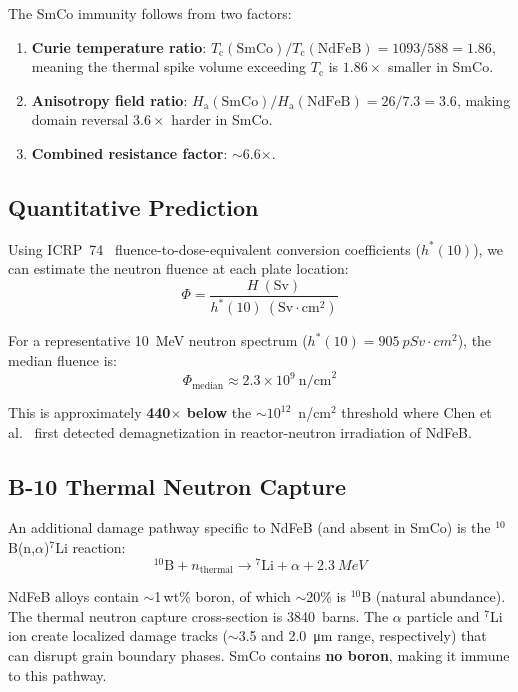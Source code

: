\documentclass[11pt,letterpaper]{article}
\newcommand{\ndfeb}{NdFeB}
\newcommand{\smco}{SmCo}
\newcommand{\Tc}{T_\mathrm{c}}
\newcommand{\Ha}{H_\mathrm{a}}
\begin{document}
The \smco{} immunity follows from two factors:
\begin{enumerate}
    \item \textbf{Curie temperature ratio}: $\Tc(\mathrm{SmCo})/\Tc(\mathrm{NdFeB}) =
    1093/588 = 1.86$, meaning the thermal spike volume exceeding $\Tc$ is
    $1.86\times$ smaller in \smco{}.
    \item \textbf{Anisotropy field ratio}: $\Ha(\mathrm{SmCo})/\Ha(\mathrm{NdFeB}) =
    26/7.3 = 3.6$, making domain reversal $3.6\times$ harder in \smco{}.
    \item \textbf{Combined resistance factor}: $\sim$6.6$\times$.
\end{enumerate}

\subsection{Quantitative Prediction}
\label{sec:quantitative_prediction}

Using ICRP~74~\cite{ICRP74} fluence-to-dose-equivalent conversion coefficients
($h^*(10)$), we can estimate the neutron fluence at each plate location:
\begin{equation}
    \Phi = \frac{H~(\mathrm{Sv})}{h^*(10)~(\mathrm{Sv} \cdot \mathrm{cm}^2)}
\end{equation}

For a representative \SI{10}{MeV} neutron spectrum ($h^*(10) = \SI{905}{pSv
\cdot cm^2}$), the median fluence is:
\begin{equation*}
    \Phi_\mathrm{median} \approx 2.3 \times 10^9~\mathrm{n/cm}^2
\end{equation*}

This is approximately \textbf{440$\times$ below} the $\sim$$10^{12}$~n/cm$^2$
threshold where Chen et al.~\cite{Chen2014} first detected demagnetization in
reactor-neutron irradiation of \ndfeb{}.

\subsection{B-10 Thermal Neutron Capture}

An additional damage pathway specific to \ndfeb{} (and absent in \smco{}) is
the ${}^{10}$B(n,$\alpha$)${}^{7}$Li reaction:
\begin{equation*}
    {}^{10}\mathrm{B} + n_\mathrm{thermal} \to {}^{7}\mathrm{Li} + \alpha
    + \SI{2.3}{MeV}
\end{equation*}

NdFeB alloys contain $\sim$1\,wt\% boron, of which $\sim$20\% is
${}^{10}$B (natural abundance). The thermal neutron capture cross-section is
\SI{3840}{barns}. The $\alpha$ particle and ${}^{7}$Li ion create localized
damage tracks ($\sim$3.5 and \SI{2.0}{\micro m} range, respectively) that can
disrupt grain boundary phases. SmCo contains \textbf{no boron}, making it
immune to this pathway.
\end{document}
